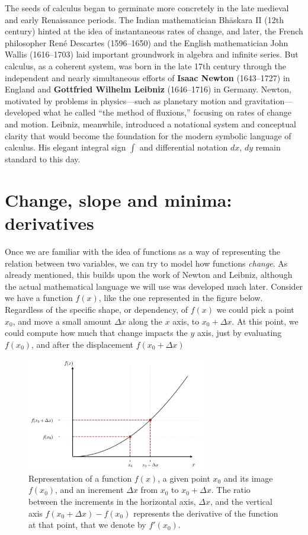 \documentclass{book}
\begin{document}
The seeds of calculus began to germinate more concretely in the late medieval and early Renaissance periods. The Indian mathematician Bhāskara II (12th century) hinted at the idea of instantaneous rates of change, and later, the French philosopher René Descartes (1596--1650) and the English mathematician John Wallis (1616--1703) laid important groundwork in algebra and infinite series. But calculus, as a coherent system, was born in the late 17th century through the independent and nearly simultaneous efforts of \textbf{Isaac Newton} (1643--1727) in England and \textbf{Gottfried Wilhelm Leibniz} (1646--1716) in Germany. Newton, motivated by problems in physics---such as planetary motion and gravitation---developed what he called ``the method of fluxions,'' focusing on rates of change and motion. Leibniz, meanwhile, introduced a notational system and conceptual clarity that would become the foundation for the modern symbolic language of calculus. His elegant integral sign $\int$ and differential notation $dx$, $dy$ remain standard to this day.\\

\section{Change, slope and minima: derivatives}

Once we are familiar with the idea of functions as a way of representing the relation between two variables, we can try to model how functions \textit{change}. As already mentioned, this builds upon the work of Newton and Leibniz, although the actual mathematical language we will use was developed much later. Consider we have a function $f(x)$, like the one represented in the figure below. Regardless of the specific shape, or dependency, of $f(x)$ we could pick a point $x_0$, and move a small amount $\Delta x$ along the $x$ axis, to $x_0 + \Delta x$. At this point, we could compute how much that change impacts the $y$ axis, just by evaluating $f(x_0)$, and after the displacement $f(x_0 + \Delta x)$

\begin{figure}[ht]
    \centering
    \includegraphics[width=0.7\textwidth]{figures/appendix/functions_point_2.png}
    \caption{Representation of a function $f(x)$, a given point $x_0$ and its image $f(x_0)$, and an increment $\Delta x$ from $x_0$ to $x_0 + \Delta x$. The ratio between the increments in the horizontal axis, $\Delta x$, and the vertical axis $f(x_0 + \Delta x) - f(x_0)$ represents the derivative of the function at that point, that we denote by $f'(x_0)$.}
    \label{fig:functions_point_2}
\end{figure}
\end{document}
